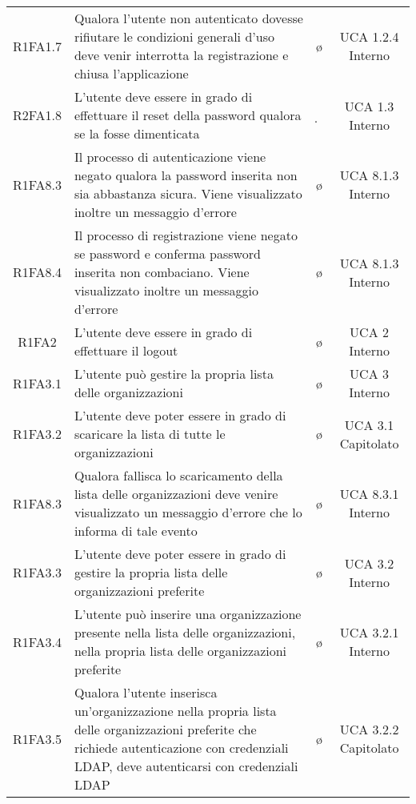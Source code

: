 {\begin{longtable}{ c C{8cm} c c}
R1FA1.7 & Qualora l'utente non autenticato dovesse rifiutare le condizioni generali d'uso deve venir interrotta la registrazione e chiusa l'applicazione & \o & UCA 1.2.4 Interno\\

R2FA1.8 & L'utente deve essere in grado di effettuare il reset della password qualora se la fosse dimenticata & \d & UCA 1.3 Interno\\

R1FA8.3 & Il processo di autenticazione viene negato qualora la password inserita non sia abbastanza sicura. Viene visualizzato inoltre un messaggio d'errore & \o & UCA 8.1.3 Interno\\

R1FA8.4 & Il processo di registrazione viene negato se password e conferma password inserita non combaciano. Viene visualizzato inoltre un messaggio d'errore & \o & UCA 8.1.3 Interno\\


R1FA2 & L'utente deve essere in grado di effettuare il logout & \o & UCA 2 Interno\\

R1FA3.1 & L'utente può gestire la propria lista delle organizzazioni& \o & UCA 3 Interno\\

R1FA3.2 & L'utente deve poter essere in grado di scaricare la lista di tutte le organizzazioni & \o & UCA 3.1 Capitolato \\

R1FA8.3 & Qualora fallisca lo scaricamento della lista delle organizzazioni deve venire visualizzato un messaggio d'errore che lo informa di tale evento & \o & UCA 8.3.1 Interno \\

R1FA3.3 & L’utente deve poter essere in grado di gestire la propria lista delle organizzazioni preferite & \o & UCA 3.2 Interno \\

R1FA3.4 & L’utente può inserire una organizzazione presente nella lista delle organizzazioni, nella propria lista delle organizzazioni preferite & \o & UCA 3.2.1 Interno \\

R1FA3.5 & Qualora l’utente inserisca un'organizzazione nella propria lista delle organizzazioni preferite che richiede autenticazione con credenziali LDAP, deve autenticarsi con credenziali LDAP & \o & UCA 3.2.2 Capitolato\\


\end{longtable}}
